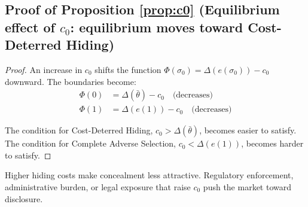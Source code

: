 \documentclass[10pt,letterpaper]{bp-template-concise}
\begin{document}
\subsection*{Proof of Proposition \ref{prop:c0} (Equilibrium effect of $c_0$: equilibrium moves toward Cost-Deterred Hiding)}

\begin{proof}
An increase in $c_0$ shifts the function $\Phi(\sigma_0) = \Delta(e(\sigma_0)) - c_0$ downward. The boundaries become:
\begin{equation}
    \begin{split}
        \Phi(0) &= \Delta(\bar{\theta}) - c_0 \quad \text{(decreases)} \\
        \Phi(1) &= \Delta(e(1)) - c_0 \quad \text{(decreases)}
    \end{split}
\end{equation}

The condition for Cost-Deterred Hiding, $c_0 > \Delta(\bar{\theta})$, becomes easier to satisfy. The condition for Complete Adverse Selection, $c_0 < \Delta(e(1))$, becomes harder to satisfy.
\end{proof}

Higher hiding costs make concealment less attractive. Regulatory enforcement, administrative burden, or legal exposure that raise $c_0$ push the market toward disclosure.



\clearpage


\end{document}

